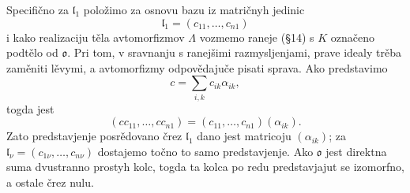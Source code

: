 \documentclass[11pt]{article}
\providecommand{\mo}{\mathfrak{o}}
\providecommand{\ml}{\mathfrak{l}}
\begin{document}
Specifično za $\ml_1$ položimo za osnovu bazu iz matričnyh jedinic
\[
        \ml_1=(c_{11},\ldots,c_{n1})
\]
i kako realizaciju těla avtomorfizmov $\Lambda$ vozmemo raneje (§14) s $K$ označeno podtělo od $\mo$. Pri tom, v sravnanju s ranejšimi razmysljenjami, prave idealy trěba zaměniti lěvymi, a avtomorfizmy odpovědajuče pisati sprava. Ako predstavimo
\[
        c=\sum_{i,k} c_{ik}\alpha_{ik},
\]
togda jest
\[
        (cc_{11},\ldots,cc_{n1})=(c_{11},\ldots,c_{n1})(\alpha_{ik}).
\]
Zato predstavjenje posrědovano črez $\ml_1$ dano jest matricoju $(\alpha_{ik})$; za $\ml_\nu=(c_{1\nu},\ldots,c_{n\nu})$ dostajemo točno to samo predstavjenje. Ako $\mo$ jest direktna suma dvustranno prostyh kolc, togda ta kolca po redu predstavjajut se izomorfno, a ostale črez nulu.
\end{document}

